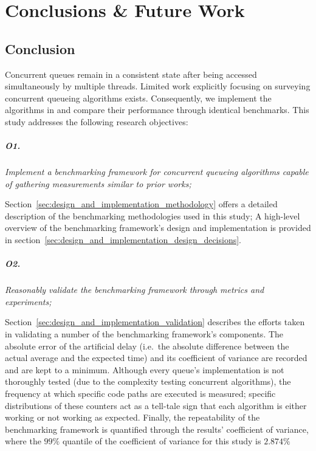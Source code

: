 \chapter{Conclusions \& Future Work}
\section{Conclusion}
Concurrent queues remain in a consistent state after being accessed
simultaneously by multiple threads. Limited work explicitly focusing on surveying concurrent
queueing algorithms exists. Consequently, we implement the algorithms
in \citep{michael1996simple,hoffman2007baskets,valois1994queues} and compare
their performance through identical benchmarks. This study addresses the following research
objectives:

\paragraph{O1.} \emph{Implement a benchmarking framework for concurrent
queueing algorithms capable of gathering measurements similar to prior works;}

Section~\ref{sec:design_and_implementation_methodology} offers a detailed
description of the benchmarking methodologies used in this study; A high-level
overview of the benchmarking framework's design and implementation is provided in
section~\ref{sec:design_and_implementation_design_decisions}.

\paragraph{O2.} \emph{Reasonably validate the benchmarking framework through
metrics and experiments;}

Section~\ref{sec:design_and_implementation_validation} describes the efforts
taken in validating a number of the benchmarking framework's components.
The absolute error of the artificial delay (i.e.~the absolute difference
between the actual average and the expected time) and its coefficient of
variance are recorded and are kept to a minimum.
Although every queue's implementation is not thoroughly tested (due to the
complexity testing concurrent algorithms), the frequency at which specific code
paths are executed is measured; specific distributions of these counters act as
a tell-tale sign that each algorithm is either working or not working as
expected. Finally, the repeatability of the benchmarking framework is
quantified through the results' coefficient of variance, where the $99\%$
quantile of the coefficient of variance for this study is $2.874\%$

